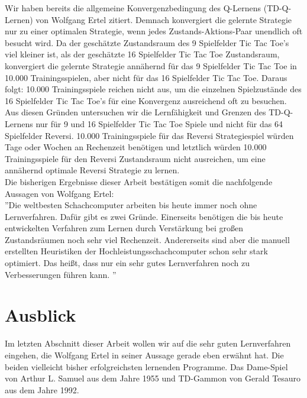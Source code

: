 Wir haben bereits die allgemeine Konvergenzbedingung des Q-Lernens (TD-Q-Lernen) von Wolfgang Ertel zitiert. Demnach konvergiert die gelernte Strategie nur zu einer optimalen Strategie, wenn jedes Zustands-Aktions-Paar unendlich oft besucht wird. Da der geschätzte Zustandsraum des 9 Spielfelder Tic Tac Toe's viel kleiner ist, als der geschätzte 16 Spielfelder Tic Tac Toe Zustandsraum, konvergiert die gelernte Strategie annähernd für das 9 Spielfelder Tic Tac Toe in 10.000 Trainingsspielen, aber nicht für das 16 Spielfelder Tic Tac Toe. Daraus folgt: 10.000 Trainingsspiele reichen nicht aus, um die einzelnen Spielzustände des 16 Spielfelder Tic Tac Toe's für eine Konvergenz ausreichend oft zu besuchen. \\  

Aus diesen Gründen untersuchen wir die Lernfähigkeit und Grenzen des TD-Q-Lernens nur für 9 und 16 Spielfelder Tic Tac Toe Spiele und nicht für das 64 Spielfelder Reversi. 10.000 Trainingsspiele für das Reversi Strategiespiel würden Tage oder Wochen an Rechenzeit benötigen und letztlich würden 10.000 Trainingsspiele für den Reversi Zustandsraum nicht ausreichen, um eine annähernd optimale Reversi Strategie zu lernen. \\

Die bisherigen Ergebnisse dieser Arbeit bestätigen somit die nachfolgende Aussagen von Wolfgang Ertel: \\

''Die weltbesten Schachcomputer arbeiten bis heute immer noch ohne Lernverfahren. Dafür gibt es zwei Gründe. Einerseits benötigen die bis heute entwickelten Verfahren zum Lernen durch Verstärkung bei großen Zustandsräumen noch sehr viel Rechenzeit. Andererseits sind aber die manuell erstellten Heuristiken der Hochleistungsschachcomputer schon sehr stark optimiert. Das heißt, dass nur ein sehr gutes Lernverfahren noch zu Verbesserungen führen kann. \cite[120]{Ertel}''\\

\section{Ausblick}
\label{sec:Ausblick}
Im letzten Abschnitt dieser Arbeit wollen wir auf die sehr guten Lernverfahren eingehen, die Wolfgang Ertel in seiner Aussage gerade eben erwähnt hat. Die beiden vielleicht bisher erfolgreichsten lernenden Programme. Das Dame-Spiel von Arthur L. Samuel aus dem Jahre 1955 und TD-Gammon von Gerald Tesauro aus dem Jahre 1992. 

